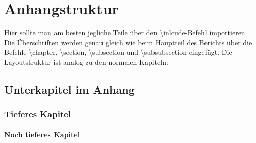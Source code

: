 %
\chapter{Anhangstruktur} \label{refChapterAnhang}%
%
Hier sollte man am besten jegliche Teile über den \textbackslash inlcude-Befehl importieren. Die Überschriften werden genau gleich wie beim Hauptteil des Berichts über die Befehle \textbackslash chapter, \textbackslash section, \textbackslash subsection und \textbackslash subsubsection eingefügt. Die Layoutstruktur ist analog zu den normalen Kapiteln:%
%
\section{Unterkapitel im Anhang} \label{refSectionAnhang}%
%
\blindtext%
%
\subsection{Tieferes Kapitel}%
%
\subsubsection{Noch tieferes Kapitel}%
%
\blindtext%
%
%
%